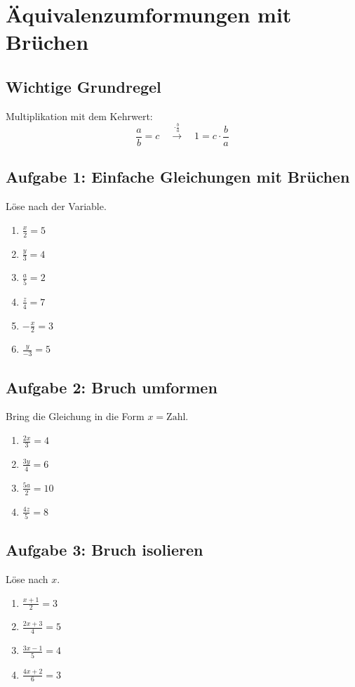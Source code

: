 \documentclass[12pt]{article}
\begin{document}
\section*{Äquivalenzumformungen mit Brüchen}

\subsection*{Wichtige Grundregel}
Multiplikation mit dem Kehrwert:
\[
  \frac{a}{b} = c \quad \xrightarrow{\cdot \frac{b}{a}} \quad 1 = c \cdot \frac{b}{a}
\]

\subsection*{Aufgabe 1: Einfache Gleichungen mit Brüchen}
Löse nach der Variable.
\begin{enumerate}
  \item \(\frac{x}{2} = 5\)
  \item \(\frac{y}{3} = 4\)
  \item \(\frac{a}{5} = 2\)
  \item \(\frac{z}{4} = 7\)
  \item \(-\frac{x}{2} = 3\)
  \item \(\frac{y}{-3} = 5\)
\end{enumerate}

\subsection*{Aufgabe 2: Bruch umformen}
Bring die Gleichung in die Form \(x = \text{Zahl}\).
\begin{enumerate}
  \item \(\frac{2x}{3} = 4\)
  \item \(\frac{3y}{4} = 6\)
  \item \(\frac{5a}{2} = 10\)
  \item \(\frac{4z}{5} = 8\)
\end{enumerate}

\subsection*{Aufgabe 3: Bruch isolieren}
Löse nach \(x\).
\begin{enumerate}
  \item \(\frac{x + 1}{2} = 3\)
  \item \(\frac{2x + 3}{4} = 5\)
  \item \(\frac{3x - 1}{5} = 4\)
  \item \(\frac{4x + 2}{6} = 3\)
\end{enumerate}
\end{document}
